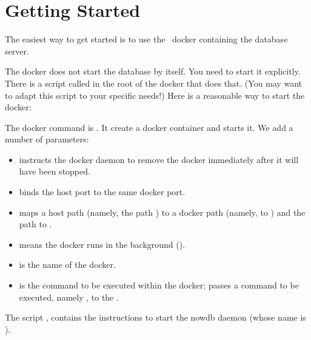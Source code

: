 \section{Getting Started}

The easiest way to get started
is to use the \nowdb\ docker containing
the database server.


The docker does not start the database by itself.
You need to start it explicitly. There is a script
called  in the root of the docker
that does that.
(You may want to adapt this script to your specific needs!)
Here is a reasonable way to start the docker:


The docker command is .
It create a docker container and starts it.
We add a number of parameters:
\begin{itemize}
\item {}
instructs the docker daemon to remove
the docker immediately after it will have been stopped.

\item {} binds the host port 
to the same docker port.

\item {} maps a host path
(namely, the path ) to a docker path
(namely, to ) and
the path  to .

\item {} means the docker runs in the background
().

\item {} is the name of the docker.

\item {} is the command to be executed
within the docker;  passes a command
to be executed,
namely ,
to the .
\end{itemize}

The script , contains the
instructions to start the nowdb daemon (whose name is
).

